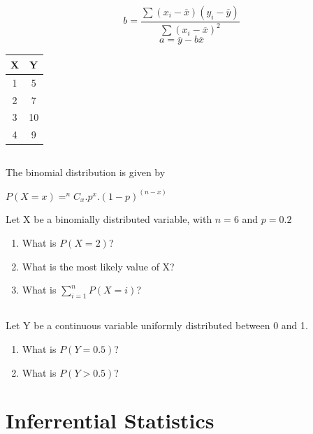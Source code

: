 \documentclass[twocolumn]{article}
\begin{document}
    \begin{multicols}{2}
    $$ b = \frac{\sum{(x_i - \overline{x})(y_i - \overline{y})}}{\sum{(x_i - \overline{x})^2}} $$
    $$ a = \overline{y} - b\overline{x}$$
    \begin{center}
        \begin{tabular}{c | c}
            \toprule
            X & Y  \\
            \midrule
            1 & 5 \\
            2 & 7 \\
            3 & 10 \\
            4 & 9 \\
            \bottomrule
        \end{tabular}        
    \end{center}
\end{multicols}

\subsection{}

The binomial distribution is given by 

\begin{center}
    $P(X = x) = ^nC_x.p^x.(1-p)^{(n-x)}$
\end{center}

Let X be a binomially distributed variable, with $n=6$ and $p=0.2$

\begin{enumerate}
    \item What is $P(X=2)$?
    \item What is the most likely value of X?
    \item What is $\sum_{i=1}^n P(X = i)$?
\end{enumerate}

\subsection{}

Let Y be a continuous variable uniformly distributed between 0 and 1.

\begin{enumerate}
    \item What is $P(Y = 0.5)$?
    \item What is $P(Y > 0.5)$?
\end{enumerate}


\clearpage
\section{Inferrential Statistics}
\end{document}
